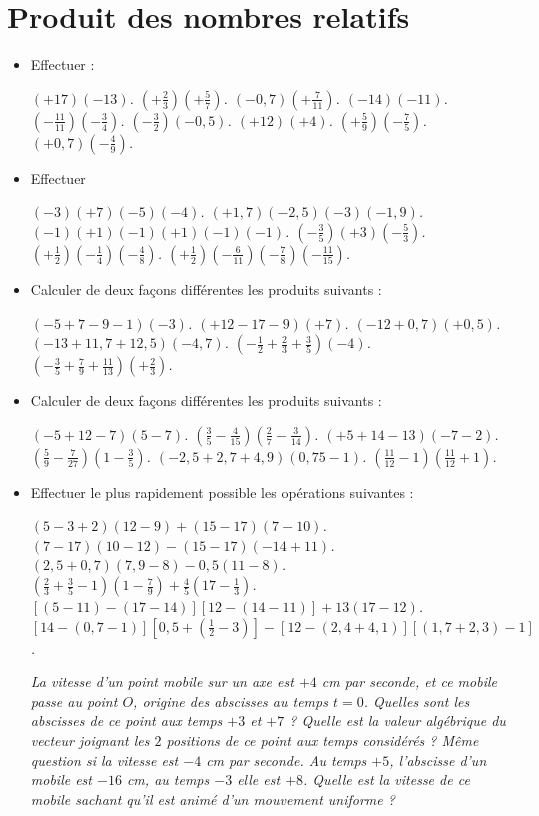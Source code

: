 \chapter{Produit des nombres relatifs}

\begin{itemize}
\item Effectuer : 
\begin{itemize}
\it $(+17)(-13)$.
\it $\left(+\frac23\right)\left(+\frac57\right)$.
\it $(-0,7)\left(+\frac7{11}\right)$.
\it $(-14)(-11)$.
\it $\left(-\frac{11}{11}\right)\left(-\frac34\right)$.
\it $\left(-\frac32\right)(-0,5)$.
\it $(+12)(+4)$.
\it $\left(+\frac59\right)\left(-\frac75\right)$.
\it $(+0,7)\left(-\frac49\right)$.
\end{itemize}
\item Effectuer 
\begin{itemize}
\it $(-3)(+7)(-5)(-4)$.
\it $(+1,7)(-2,5)(-3)(-1,9)$.
\it $(-1)(+1)(-1)(+1)(-1)(-1)$.
\it $\left(-\frac35\right)(+3)\left(-\frac53\right)$.
\it $\left(+\frac12\right)\left(-\frac14\right)\left(-\frac48\right)$.
\it $\left(+\frac12\right)\left(-\frac6{11}\right)\left(-\frac78\right)\left(-\frac{11}{15}\right)$.
\end{itemize}
\item Calculer de deux façons différentes les produits suivants : 
\begin{itemize}
\it $(-5+7-9-1)(-3)$.
\it $(+12-17-9)(+7)$.
\it $(-12+0,7)(+0,5)$.
\it $(-13+11,7+12,5)(-4,7)$.
\it $\left(-\frac12+\frac23+\frac35\right)(-4)$.
\it $\left(-\frac35+\frac79+\frac{11}{13}\right)\left(+\frac23\right)$.
\end{itemize}
\item Calculer de deux façons différentes les produits suivants : 
\begin{itemize}
\it $(-5+12-7)(5-7)$.
\it $\left(\frac35-\frac4{15}\right)\left(\frac27-\frac3{14}\right)$.
\it $(+5+14-13)(-7-2)$.
\it $\left(\frac59-\frac{7}{27}\right)\left(1-\frac35\right)$.
\it $(-2,5+2,7+4,9)(0,75-1)$.
\it $\left(\frac{11}{12}-1\right)\left(\frac{11}{12}+1\right)$.
\end{itemize}
\item Effectuer le plus rapidement possible les opérations suivantes : 
\begin{itemize}
\it $(5-3+2)(12-9)+(15-17)(7-10)$.
\it $(7-17)(10-12) - (15-17)(-14+11)$.
\it $(2,5+0,7)(7,9-8)-0,5(11-8)$.
\it $\left(\frac23+\frac35-1\right)\left(1-\frac79\right)+\frac45\left(17-\frac13\right)$.
\it $[(5-11)-(17-14)][12-(14-11)] + 13(17-12)$.
\it $[14-(0,7-1)]\left[0,5+\left(\frac12-3\right)\right] - [12-(2,4+4,1)][(1,7+2,3)-1]$. 
\end{itemize}
\it La vitesse d'un point mobile sur un axe est $+4$ cm par seconde, et ce mobile passe au point $O$, origine des abscisses au temps $t=0$. Quelles sont les abscisses de ce point aux temps $+3$ et $+7$ ? Quelle est la valeur algébrique du vecteur joignant les $2$ positions de ce point aux temps considérés ? Même question si la vitesse est $-4$ cm par seconde. 
\it Au temps $+5$, l'abscisse d'un mobile est $-16$ cm, au temps $-3$ elle est $+8$. Quelle est la vitesse de ce mobile sachant qu'il est animé d'un mouvement uniforme ? 
\end{itemize}